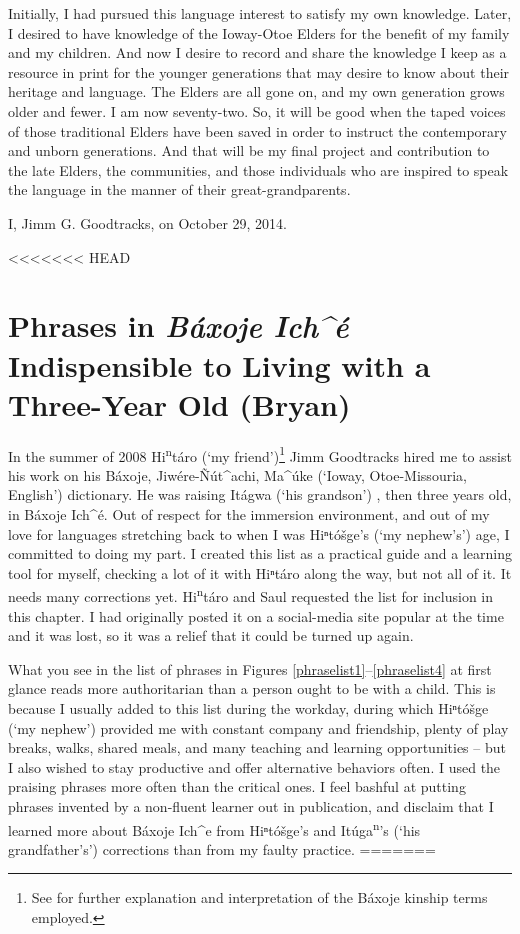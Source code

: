 \documentclass[output=paper]{LSP/langsci}
\begin{document}
Initially, I had pursued this language interest to satisfy my own knowledge. Later, I desired to have knowledge of the Ioway-Otoe Elders for the benefit of my family and my children. And now I desire to record and share the knowledge I keep as a resource in print for the younger generations that may desire to know about their heritage and language. The Elders are all gone on, and my own generation grows older and fewer. I am now seventy-two. So, it will be good when the taped voices of those traditional Elders have been saved in order to instruct the contemporary and unborn generations. And that will be my final project and contribution to the late Elders, the communities, and those individuals who are inspired to speak the language in the manner of their great-grandparents.

I, Jimm G. Goodtracks, on October 29, 2014.

<<<<<<< HEAD
\section{Phrases in \emph{Báxoje Ich\^{ }\'e} Indispensible to Living with a Three-Year Old (Bryan)}
	In the summer of 2008 Hi\textsuperscript{n}táro (`my friend')\footnote{See  for further explanation and interpretation of the Báxoje kinship terms employed.} Jimm Goodtracks hired me to assist his work on his Báxoje, Jiw\'ere-\~N\'ut\^{ }achi, Ma\^{ }\'uke (`Ioway, Otoe-Missouria, English') dictionary. He was raising Itágwa (`his grandson') , then three years old, in Báxoje Ich\^{ }\'e. Out of respect for the immersion environment, and out of my love for languages stretching back to when I was Hiⁿtóšge's (`my nephew's') age, I committed to doing my part. I created this list as a practical guide and a learning tool for myself, checking a lot of it with Hiⁿtáro along the way, but not all of it. It needs many corrections yet. Hi\textsuperscript{n}táro and Saul requested the list for inclusion in this chapter. I had originally posted it on a social-media site popular at the time and it was lost, so it was a relief that it could be turned up again. 

What you see in the list of phrases in Figures \ref{phraselist1}--\ref{phraselist4} at first glance reads more authoritarian than a person ought to be with a child. This is because I usually added to this list during the workday, during which Hiⁿtóšge (`my nephew') provided me with constant company and friendship, plenty of play breaks, walks, shared meals, and many teaching and learning opportunities -- but I also wished to stay productive and offer alternative behaviors often. I used the praising phrases more often than the critical ones. I feel bashful at putting phrases invented by a non-fluent learner out in publication, and disclaim that I learned more about Báxoje Ich\^{ }e from Hiⁿtóšge's and It\'uga\textsuperscript{n}'s (`his grandfather's') corrections than from my faulty practice. 
=======
\end{document}
